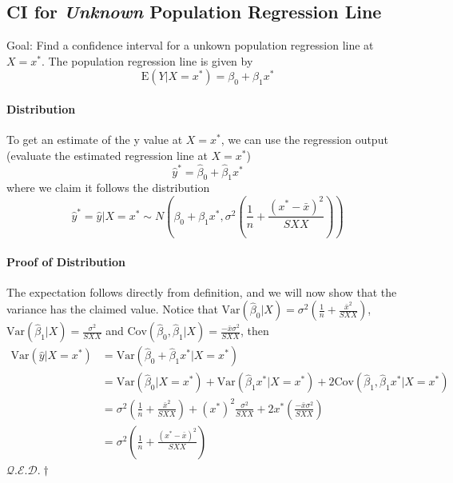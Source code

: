 \documentclass[11pt]{article}
\newcommand{\qed}{\hfill $\mathcal{Q}.\mathcal{E}.\mathcal{D}.\dagger$}
\begin{document}
\subsection{CI for \textit{Unknown} Population Regression Line}
Goal: Find a confidence interval for a unkown population regression line at $X = x^\ast$. The population regression line is given by
\begin{equation*}
    \mathrm{E}\left(Y | X=x^{*}\right)=\beta_{0}+\beta_{1} x^{*}
\end{equation*}
\paragraph{Distribution}
To get an estimate of the y value at $X = x^*$, we can use the regression output (evaluate the estimated regression line at $X = x^*$)
\begin{equation*}
    \hat{y}^{*}=\hat{\beta}_{0}+\hat{\beta}_{1} x^{*}
\end{equation*}
where we claim it follows the distribution
\begin{equation*}
    \hat{y}^{*}=\hat{y} | X=x^{*} \sim N\left(\beta_{0}+\beta_{1} x^{*}, \sigma^{2}\left(\frac{1}{n}+\frac{\left(x^{*}-\bar{x}\right)^{2}}{S X X}\right)\right)
\end{equation*}
\paragraph{Proof of Distribution}
The expectation follows directly from definition, and we will now show that the variance has the claimed value. Notice that $\text{Var}(\hat{\beta}_0|X) = \sigma^2 \left(\frac{1}{n} + \frac{\bar{x}^2}{SXX}\right)$, $\text{Var}(\hat{\beta}_1|X) = \frac{\sigma^2}{SXX}$ and $\text{Cov}(\hat{\beta}_0, \hat{\beta}_1 | X) = \frac{-\bar{x}\sigma^2}{SXX}$, then
\begin{align*}
    \text{Var}(\hat{y}|X = x^*)
    &= \text{Var}( \hat{\beta}_0 + \hat{\beta}_1 x^* |X = x^* ) \\
    &= \text{Var}(\hat{\beta}_0 | X = x^*) + \text{Var}(\hat{\beta}_1 x^* |X = x^*) + 2\text{Cov}(\hat{\beta}_1, \hat{\beta}_1 x^* | X = x^*) \\
    &= \sigma^2 \left(\frac{1}{n} + \frac{\bar{x}^2}{SXX}\right) + (x^*)^2 \frac{\sigma^2}{SXX} + 2x^* \left(\frac{-\bar{x}\sigma^2}{SXX}\right) \\
    &= \sigma^{2}\left(\frac{1}{n}+\frac{\left(x^{*}-\bar{x}\right)^{2}}{S X X}\right)
\end{align*}
\hfill \qed
\end{document}
